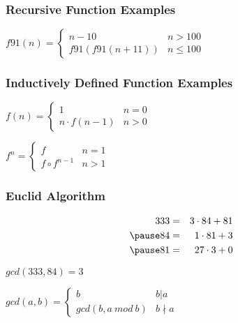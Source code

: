 \documentclass[dvipsnames]{beamer}
\begin{document}
\begin{frame}
  \frametitle{Recursive Function Examples}

  \begin{example}
    $f91(n) = \left\{
      \begin{array}{ll}
        n - 10         & n > 100\\
        f91(f91(n+11)) & n \leq 100
      \end{array}
    \right.$
  \end{example}
\end{frame}

\begin{frame}
  \frametitle{Inductively Defined Function Examples}

  \begin{example}[factorial]
    $f(n) = \left\{
      \begin{array}{ll}
        1              & n = 0\\
        n \cdot f(n-1) & n > 0
      \end{array}
    \right.$
  \end{example}

  \pause
  \begin{example}
    $f^n = \left\{
      \begin{array}{ll}
        f               & n = 1\\
        f \circ f^{n-1} & n > 1
      \end{array}
    \right.$
  \end{example}
\end{frame}

\begin{frame}
  \frametitle{Euclid Algorithm}

  \begin{example}
    \begin{eqnarray*}
      333 & = & 3 \cdot 84 + 81\\\pause
       84 & = & 1 \cdot 81 + 3\\\pause
       81 & = & 27 \cdot 3 + 0
    \end{eqnarray*}

    \pause
    $gcd(333,84) = 3$

    \pause
    \medskip
    $gcd(a,b) = \left\{
      \begin{array}{ll}
        b               & b | a\\
        gcd(b,a~mod~b) & b \nmid a
      \end{array}
    \right.$
  \end{example}
\end{frame}
\end{document}
